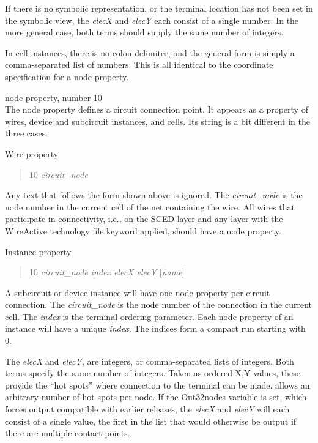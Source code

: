 \begin{description}
If there is no symbolic representation, or the terminal location has
not been set in the symbolic view, the {\it elecX} and {\it elecY}
each consist of a single number.  In the more general case, both terms
should supply the same number of integers.

In cell instances, there is no colon delimiter, and the general form
is simply a comma-separated list of numbers.  This is all identical to
the coordinate specification for a {\et node} property.

\item{\et node} property, number 10\\
The {\et node} property defines a circuit connection point.  It
appears as a property of wires, device and subcircuit instances, and
cells.  Its string is a bit different in the three cases.

Wire property\\
\begin{quote}{ 10} {\it circuit\_node}
\end{quote}

Any text that follows the form shown above is ignored.  The {\it
circuit\_node} is the node number in the current cell of the net
containing the wire.  All wires that participate in connectivity,
i.e., on the {\vt SCED} layer and any layer with the {\vt WireActive}
technology file keyword applied, should have a {\et node} property.

Instance property\\
\begin{quote}{ 10} {\it circuit\_node index elecX  elecY\/} [{\it name\/}]
\end{quote}

A subcircuit or device instance will have one {\et node} property per
circuit connection.  The {\it circuit\_node} is the node number of the
connection in the current cell.  The {\it index} is the terminal
ordering parameter.  Each {\et node} property of an instance will have
a unique {\it index\/}.  The indices form a compact run starting with
0.

The {\it elecX} and {\it elecY}, are integers, or comma-separated
lists of integers.  Both terms specify the same number of integers. 
Taken as ordered X,Y values, these provide the ``hot spots'' where
connection to the terminal can be made.  {\Xic} allows an arbitrary
number of hot spots per node.  If the {\et Out32nodes} variable is
set, which forces output compatible with earlier {\Xic} releases, the
{\it elecX} and {\it elecY} will each consist of a single value, the
first in the list that would otherwise be output if there are multiple
contact points.


\end{description}
